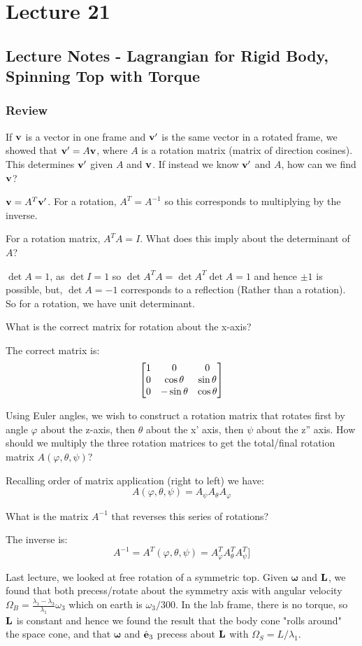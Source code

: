 \documentclass[../PHYS306Notes.tex]{subfiles}
\begin{document}
\section{Lecture 21}
\subsection{Lecture Notes - Lagrangian for Rigid Body, Spinning Top with Torque}
\subsubsection{Review}
If $\mathbf{v}$ is a vector in one frame and $\mathbf{v}'$ is the same vector in a rotated frame, we showed that $\mathbf{v}' = A\mathbf{v}$, where $A$ is a rotation matrix (matrix of direction cosines). This determines $\mathbf{v}'$ given $A$ and $\mathbf{v}$. If instead we know $\mathbf{v}'$ and $A$, how can we find $\mathbf{v}$?
\begin{s}
$\mathbf{v} = A^T\mathbf{v}'$. For a rotation, $A^T = A^{-1}$ so this corresponds to multiplying by the inverse.  
\end{s}
\noindent For a rotation matrix, $A^TA = I$. What does this imply about the determinant of $A$?
\begin{s}
$\det A = 1$, as $\det I = 1$ so $\det A^T A = \det A^T\det A= 1$ and hence $\pm 1$ is possible, but, $\det A = -1$ corresponds to a reflection (Rather than a rotation). So for a rotation, we have unit determinant.
\end{s}
\noindent What is the correct matrix for rotation about the x-axis?
\begin{s}
The correct matrix is:
\[\begin{bmatrix}1 & 0 & 0 \\ 0 & \cos\theta & \sin\theta \\ 0 & -\sin\theta & \cos\theta\end{bmatrix}\]
\end{s}
\noindent Using Euler angles, we wish to construct a rotation matrix that rotates first by angle $\varphi$ about the z-axis, then $\theta$ about the x' axis, then $\psi$ about the z'' axis. How should we multiply the three rotation matrices to get the total/final rotation matrix $A(\varphi ,\theta, \psi)$?
\begin{s}
Recalling order of matrix application (right to left) we have:
\[A(\varphi, \theta, \psi) = A_\psi A_\theta A_{\varphi}\]
\end{s}
What is the matrix $A^{-1}$ that reverses this series of rotations?
\begin{s}
The inverse is:
\[A^{-1} = A^T(\varphi, \theta, \psi) = A_{\varphi}^TA_\theta^TA_\psi^T]\]
\end{s}
Last lecture, we looked at free rotation of a symmetric top. Given $\bm{\omega}$ and $\mathbf{L}$, we found that both precess/rotate about the symmetry axis with angular velocity $\Omega_B = \frac{\lambda_1 - \lambda_3}{\lambda_1}\omega_3$ which on earth is $\omega_3/300$. In the lab frame, there is no torque, so $\mathbf{L}$ is constant and hence we found the result that the body cone "rolls around" the space cone, and that $\bm{\omega}$ and $\hat{\mathbf{e}}_3$ precess about $\mathbf{L}$ with $\Omega_S  = L/\lambda_1$.
\end{document}
